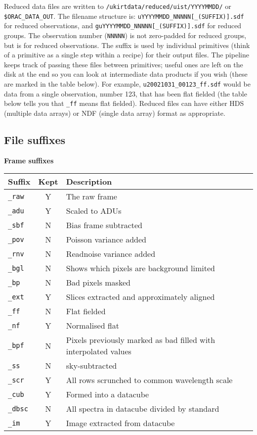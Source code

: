 \documentclass[twoside,11pt,nolof]{starlink}
\begin{document}
Reduced data files are written to \texttt{/ukirtdata/reduced/uist/YYYYMMDD/} or \texttt{\$ORAC\_DATA\_OUT}.  The
filename structure is: \texttt{uYYYYMMDD\_NNNNN[\_(SUFFIX)].sdf} for reduced
observations, and \texttt{guYYYYMMDD\_NNNNN[\_(SUFFIX)].sdf} for reduced
groups. The observation number (\texttt{NNNNN}) is not zero-padded for
reduced groups, but is for reduced observations.
The suffix is used by individual primitives (think of a primitive as
a single step within a recipe) for their output files. The pipeline
keeps track of passing these files between primitives; useful ones are
left on the disk at the end so you can look at intermediate data
products if you wish (these are marked in the table below).
For example, \texttt{u20021031\_00123\_ff.sdf} would be data from a single
observation, number 123, that has been flat fielded (the table below
tells you that \texttt{\_ff} means flat fielded). Reduced files can have either
HDS (multiple data arrays) or NDF (single data array) format as
appropriate.

\subsection{File suffixes}

\textbf{Frame suffixes}

\vspace{0.2cm}

\begin{tabular}{l c l}
\hline
Suffix & Kept & Description \hspace{9cm}  \\
\hline
\texttt{\_raw} & Y & The raw frame\\
\texttt{\_adu} & Y & Scaled to ADUs\\
\texttt{\_sbf} & N & Bias frame subtracted\\
\texttt{\_pov} & N & Poisson variance added\\
\texttt{\_rnv} & N & Readnoise variance added\\
\texttt{\_bgl} & N & Shows which pixels are background limited\\
\texttt{\_bp}  & N & Bad pixels masked\\
\texttt{\_ext} & Y & Slices extracted and approximately aligned\\
\texttt{\_ff}  & N & Flat fielded\\
\texttt{\_nf}  & Y & Normalised flat\\
\texttt{\_bpf} & N & Pixels previously marked as bad filled with
interpolated values\\
\texttt{\_ss}  & N & sky-subtracted\\
\texttt{\_scr} & Y & All rows scrunched to common wavelength scale\\
\texttt{\_cub} & Y & Formed into a datacube\\
\texttt{\_dbsc} & N & All spectra in datacube divided by standard\\
\texttt{\_im}  & Y & Image extracted from datacube\\
\hline
\end{tabular}
\end{document}
